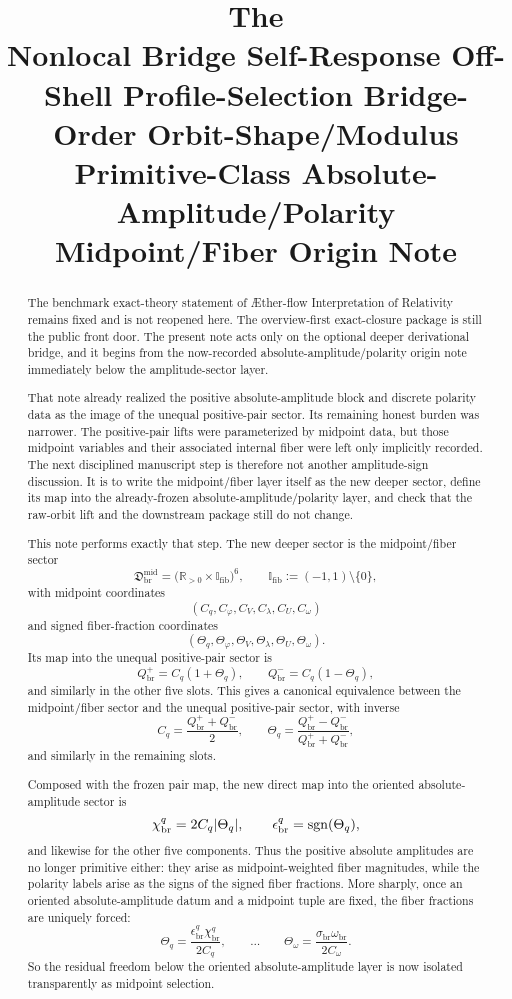 \documentclass[11pt]{article}
\title{\textbf{The \TheoryName{}}\\[0.4em]
\large Nonlocal Bridge Self-Response Off-Shell Profile-Selection Bridge-Order Orbit-Shape/Modulus Primitive-Class Absolute-Amplitude/Polarity Midpoint/Fiber Origin Note}
\author{}
\date{}
\newcommand{\Aflow}{\AE{}ther-flow}
\newcommand{\TheoryName}{\Aflow{} Interpretation of Relativity}
\newcommand{\AbsReadAmp}{\chi_{\mathrm{br}}^{q}}
\newcommand{\AbsScaleAmp}{\omega_{\mathrm{br}}}
\newcommand{\PolRead}{\epsilon_{\mathrm{br}}^{q}}
\newcommand{\PolScale}{\sigma_{\mathrm{br}}}
\newcommand{\PairReadPlus}{Q_{\mathrm{br}}^{+}}
\newcommand{\PairReadMinus}{Q_{\mathrm{br}}^{-}}
\newcommand{\MidFiberSector}{\mathfrak D_{\mathrm{br}}^{\mathrm{mid}}}
\newcommand{\MidRead}{C_{q}}
\newcommand{\MidCov}{C_{\varphi}}
\newcommand{\MidRelax}{C_{V}}
\newcommand{\MidWell}{C_{\lambda}}
\newcommand{\MidEq}{C_{U}}
\newcommand{\MidScale}{C_{\omega}}
\newcommand{\FiberRead}{\Theta_{q}}
\newcommand{\FiberCov}{\Theta_{\varphi}}
\newcommand{\FiberRelax}{\Theta_{V}}
\newcommand{\FiberWell}{\Theta_{\lambda}}
\newcommand{\FiberEq}{\Theta_{U}}
\newcommand{\FiberScale}{\Theta_{\omega}}
\newcommand{\FiberDom}{\mathbb I_{\mathrm{fib}}}
\begin{document}
\maketitle

\begin{abstract}
The benchmark exact-theory statement of \TheoryName{} remains fixed and is not reopened here. The overview-first exact-closure package is still the public front door. The present note acts only on the optional deeper derivational bridge, and it begins from the now-recorded absolute-amplitude/polarity origin note immediately below the amplitude-sector layer.

That note already realized the positive absolute-amplitude block and discrete polarity data as the image of the unequal positive-pair sector. Its remaining honest burden was narrower. The positive-pair lifts were parameterized by midpoint data, but those midpoint variables and their associated internal fiber were left only implicitly recorded. The next disciplined manuscript step is therefore not another amplitude-sign discussion. It is to write the midpoint/fiber layer itself as the new deeper sector, define its map into the already-frozen absolute-amplitude/polarity layer, and check that the raw-orbit lift and the downstream package still do not change.

This note performs exactly that step. The new deeper sector is the midpoint/fiber sector
\[
\MidFiberSector
=
\bigl(\mathbb R_{>0}\times\FiberDom\bigr)^{6},
\qquad
\FiberDom:=(-1,1)\setminus\{0\},
\]
with midpoint coordinates
\[
(\MidRead,\MidCov,\MidRelax,\MidWell,\MidEq,\MidScale)
\]
and signed fiber-fraction coordinates
\[
(\FiberRead,\FiberCov,\FiberRelax,\FiberWell,\FiberEq,\FiberScale).
\]
Its map into the unequal positive-pair sector is
\[
\PairReadPlus=\MidRead(1+\FiberRead),
\qquad
\PairReadMinus=\MidRead(1-\FiberRead),
\]
and similarly in the other five slots. This gives a canonical equivalence between the midpoint/fiber sector and the unequal positive-pair sector, with inverse
\[
\MidRead=\frac{\PairReadPlus+\PairReadMinus}{2},
\qquad
\FiberRead=\frac{\PairReadPlus-\PairReadMinus}{\PairReadPlus+\PairReadMinus},
\]
and similarly in the remaining slots.

Composed with the frozen pair map, the new direct map into the oriented absolute-amplitude sector is
\[
\AbsReadAmp=2\MidRead\abs{\FiberRead},
\qquad
\PolRead=\operatorname{sgn}(\FiberRead),
\]
and likewise for the other five components. Thus the positive absolute amplitudes are no longer primitive either: they arise as midpoint-weighted fiber magnitudes, while the polarity labels arise as the signs of the signed fiber fractions. More sharply, once an oriented absolute-amplitude datum and a midpoint tuple are fixed, the fiber fractions are uniquely forced:
\[
\FiberRead=\frac{\PolRead\AbsReadAmp}{2\MidRead},
\qquad \ldots \qquad
\FiberScale=\frac{\PolScale\AbsScaleAmp}{2\MidScale}.
\]
So the residual freedom below the oriented absolute-amplitude layer is now isolated transparently as midpoint selection.


\end{abstract}
\end{document}
